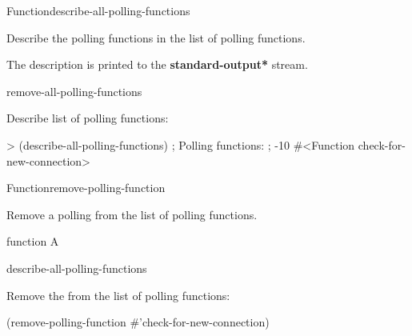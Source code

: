\documentclass[10pt,twoside,english,pdftex]{article}
\begin{document}

\begin{functiondoc}{Function}{describe-all-polling-functions}{\noargs}
%
%

\fnsyntax 

\fnpurpose Describe the polling functions in the list of polling functions.

\fnpackage {}

\fnmodule {}

\fndescription
{}%
The description is printed to the {\bf *standard-output*} stream.

\begin{alsos}{remove-all-polling-functions}
\end{alsos}

\fnexample
Describe list of polling functions:
%
\W\supp
\begin{example}
> (describe-all-polling-functions)
; Polling functions:
;    -10 #<Function check-for-new-connection>
\end{example}

\end{functiondoc}


\begin{functiondoc}{Function}{remove-polling-function}{}
%

\fnsyntax 

\fnpurpose Remove a polling  from the list of polling functions.

\fnpackage {}

\fnmodule {}

\fnargs
\begin{args}{function}
\arg[function] A 
\end{args}

\begin{alsos}{describe-all-polling-functions}
\end{alsos}

\fnexample
Remove the   from the list of polling 
functions:
%
\W\supp
\begin{example}
  (remove-polling-function #'check-for-new-connection)
\end{example}

\end{functiondoc}
\end{document}
